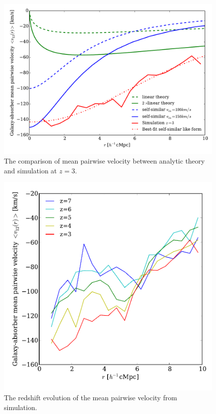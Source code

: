 \documentclass[useAMS,usenatbib,twocolumn]{mn2e}
\begin{document}
\begin{figure}
 \begin{center}
  \includegraphics[angle=0,width=\columnwidth]{figure/v12_comparison_z3.pdf}
  \caption{The comparison of mean pairwise velocity between analytic theory
    and simulation at $z=3$.}\label{v12_z3}
 \end{center}
\end{figure}



\begin{figure}
 \begin{center}
  \includegraphics[angle=0,width=\columnwidth]{figure/v12_L40P256G256R0_Gamma12_SST.pdf}
  \caption{The redshift evolution of the mean pairwise velocity 
    from simulation.}\label{simulated_v12}
 \end{center}
\end{figure}
\end{document}
